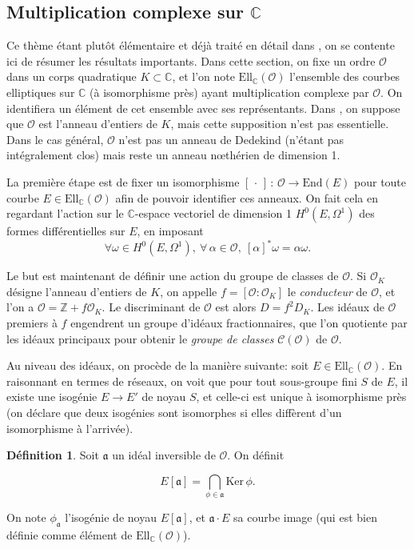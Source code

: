 \documentclass[11pt,a4paper]{article}
\newcommand{\Z}{\mathbb{Z}}
\newcommand{\C}{\mathbb{C}}
\renewcommand{\O}{\mathcal{O}}
\newcommand{\Cl}{\mathcal{C}}
\newcommand{\vers}{\longrightarrow}
\newcommand{\End}{\mathrm{End}}
\newcommand{\Ell}{\mathrm{Ell}}
\renewcommand{\frak}{\mathfrak}
\newcommand{\de}{\,:\,}
\theoremstyle{definition}
\newtheorem*{defi}{Définition}
\begin{document}
\subsection{Multiplication complexe sur $\C$}


Ce thème étant plutôt élémentaire et déjà traité en détail dans \cite{Sil2}, on se contente ici de résumer les résultats importants. Dans cette section, on fixe un ordre $\O$ dans un corps quadratique $K\subset \C$, et l'on note $\Ell_\C(\O)$ l'ensemble des courbes elliptiques sur $\C$ (à isomorphisme près) ayant multiplication complexe par $\O$. On identifiera un élément de cet ensemble avec ses représentants. Dans \cite{Sil2}, on suppose que $\O$ est l'anneau d'entiers de $K$, mais cette supposition n'est pas essentielle. Dans le cas général, $\O$ n'est pas un anneau de Dedekind (n'étant pas intégralement clos) mais reste un anneau n\oe thérien de dimension 1.

La première étape est de fixer un isomorphisme $[\,\cdot\,]\de \O\vers \End(E)$ pour toute courbe $E\in \Ell_\C(\O)$ afin de pouvoir identifier ces anneaux. On fait cela en regardant l'action sur le $\C$-espace vectoriel de dimension 1  $H^0(E,\Omega^1)$ des formes différentielles sur $E$, en imposant
$$\forall \omega\in H^0(E,\Omega^1),\ \forall\,\alpha\in\O,\ [\alpha]^*\omega = \alpha \omega.$$

Le but est maintenant de définir une action du groupe de classes de $\O$. Si $\O_K$ désigne l'anneau d'entiers de $K$, on appelle $f=[\O:\O_K]$ le \emph{conducteur} de $\O$, et l'on a $\O = \Z  + f \O_K$. Le discriminant de $\O$ est alors $D = f^2 D_K$. Les idéaux de $\O$ premiers à $f$ engendrent un groupe d'idéaux fractionnaires, que l'on quotiente par les idéaux principaux pour obtenir le \emph{groupe de classes} $\Cl(\O)$ de $\O$.

Au niveau des idéaux, on procède de la manière suivante: soit $E\in \Ell_\C(\O)$. En raisonnant en termes de réseaux, on voit que pour tout sous-groupe fini $S$ de $E$, il existe une isogénie $E\vers E'$ de noyau $S$, et celle-ci est unique à isomorphisme près (on déclare que deux isogénies sont isomorphes si elles diffèrent d'un isomorphisme à l'arrivée).

\begin{defi}
Soit $\frak a$ un idéal inversible de $\O$. On définit

$$E[\frak a]=\bigcap_{\phi\in \frak a} \mathrm{Ker}\,\phi.$$

On note $\phi_{\frak a}$ l'isogénie de noyau $E[\frak a]$, et $\frak a\cdot E$ sa courbe image (qui est bien définie comme élément de $\Ell_\C(\O)$).
\end{defi}
\end{document}
